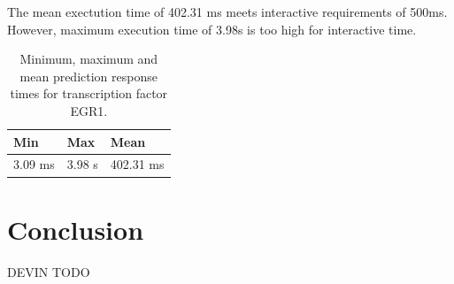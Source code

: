 \documentclass{sig-alternate-05-2015}
\begin{document}
The mean exectution time of 402.31 ms meets interactive requirements of 500ms. However, maximum execution time of 3.98s is too high for interactive time.

\begin{table}
\centering
\caption{Minimum, maximum and mean prediction response times for transcription factor EGR1.}
\label{table:fullGenome}
\begin{tabular}{|l|l|l|}
\hline
\textbf{Min} & \textbf{Max} & \textbf{Mean} \\ \hline
3.09 ms & 3.98 s & 402.31 ms  \\ \hline
\end{tabular}
\end{table}

\section{Conclusion}
DEVIN TODO


\end{document}
